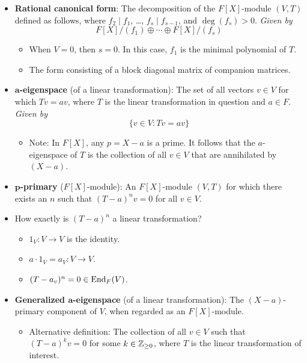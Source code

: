 \documentclass[../notes.tex]{subfiles}
\begin{document}
\begin{itemize}
\begin{itemize}
    \end{itemize}
    \item \textbf{Rational canonical form}: The decomposition of the $F[X]$-module $(V,T)$ defined as follows, where $f_2\mid f_1$, \dots, $f_s\mid f_{s-1}$, and $\deg(f_s)>0$. \emph{Given by}
    \begin{equation*}
        F[X]/(f_1)\oplus\cdots\oplus F[X]/(f_s)
    \end{equation*}
    \begin{itemize}
        \item When $V=0$, then $s=0$. In this case, $f_1$ is the minimal polynomial of $T$.
        \item The form consisting of a block diagonal matrix of companion matrices.
    \end{itemize}
    \item \textbf{$\bm{a}$-eigenspace} (of a linear transformation): The set of all vectors $v\in V$ for which $Tv=av$, where $T$ is the linear transformation in question and $a\in F$. \emph{Given by}
    \begin{equation*}
        \{v\in V:Tv=av\}
    \end{equation*}
    \begin{itemize}
        \item Note: In $F[X]$, any $p=X-a$ is a prime. It follows that the $a$-eigenspace of $T$ is the collection of all $v\in V$ that are annihilated by $(X-a)$.
    \end{itemize}
    \item \textbf{$\bm{p}$-primary} ($F[X]$-module): An $F[X]$-module $(V,T)$ for which there exists an $n$ such that $(T-a)^nv=0$ for all $v\in V$.
    \item How exactly is $(T-a)^n$ a linear transformation?
    \begin{itemize}
        \item $1_V:V\to V$ is the identity.
        \item $a\cdot 1_V=a_V:V\to V$.
        \item $(T-a_v)^n=0\in\operatorname{End}_F(V)$.
    \end{itemize}
    \item \textbf{Generalized $\bm{a}$-eigenspace} (of a linear transformation): The $(X-a)$-primary component of $V$, when regarded as an $F[X]$-module.
    \begin{itemize}
        \item Alternative definition: The collection of all $v\in V$ such that $(T-a)^kv=0$ for some $k\in{\mathbb{Z}_{\geq 0}}$, where $T$ is the linear transformation of interest.

\end{itemize}
\end{itemize}
\end{document}
